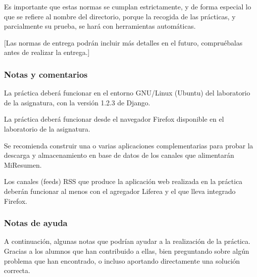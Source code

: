Es importante que estas normas se cumplan estrictamente, y de forma especial lo que se refiere al nombre del directorio, porque la recogida de las prácticas, y parcialmente su prueba, se hará con herramientas automáticas.

[Las normas de entrega podrán incluir más detalles en el futuro, compruébalas antes de realizar la entrega.]


\subsubsection{Notas y comentarios}

La práctica deberá funcionar en el entorno GNU/Linux (Ubuntu) del laboratorio de la asignatura, con la versión 1.2.3 de Django.

La práctica deberá funcionar desde el navegador Firefox disponible en el laboratorio de la asignatura.

Se recomienda construir una o varias aplicaciones complementarias para probar la descarga y almacenamiento en base de datos de los canales que alimentarán MiResumen.

Los canales (feeds) RSS que produce la aplicación web realizada en la práctica deberán funcionar al menos con el agregador Liferea y el que lleva integrado Firefox.

\subsubsection{Notas de ayuda}

A continuación, algunas notas que podrían ayudar a la realización de la práctica. Gracias a los alumnos que han contribuido a ellas, bien preguntando sobre algún problema que han encontrado, o incluso aportando directamente una solución correcta.

